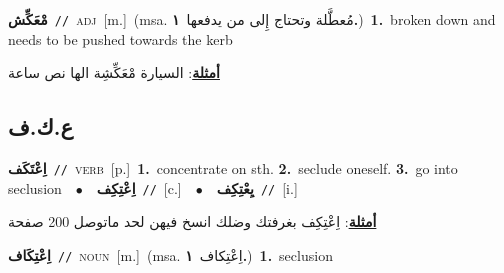 \documentclass[10pt,a4paper,twoside]{article} %
\begin{document}
\begin{multicols}{2}
{\setlength\topsep{0pt}\textbf{\foreignlanguage{arabic}{مْعَكِّش}}\ {\color{gray}\texttt{//}\color{black}}\ \textsc{adj}\ [m.]\ \color{gray}(msa. \foreignlanguage{arabic}{مُعطَّلة وتحتاج إِلى من يدفعها}~\foreignlanguage{arabic}{\textbf{١.}})\color{black}\ \textbf{1.}~broken down and needs to be pushed towards the kerb\  \begin{flushright}\color{gray}\foreignlanguage{arabic}{\textbf{\underline{\foreignlanguage{arabic}{أمثلة}}}: السيارة مْعَكِّشِة الها نص ساعة}\end{flushright}\color{black}} \vspace{2mm}

\vspace{-3mm}
\subsection*{\color{blue}\foreignlanguage{arabic}{ع.ك.ف}\color{blue}{}} 

{\setlength\topsep{0pt}\textbf{\foreignlanguage{arabic}{اِعْتَكَف}}\ {\color{gray}\texttt{//}\color{black}}\ \textsc{verb}\ [p.]\ \textbf{1.}~concentrate on sth.  \textbf{2.}~seclude oneself.  \textbf{3.}~go into seclusion\ \ $\bullet$\ \ \setlength\topsep{0pt}\textbf{\foreignlanguage{arabic}{اِعْتِكِف}}\ {\color{gray}\texttt{//}\color{black}}\ [c.]\ \ $\bullet$\ \ \setlength\topsep{0pt}\textbf{\foreignlanguage{arabic}{يِعْتِكِف}}\ {\color{gray}\texttt{//}\color{black}}\ [i.]\  \begin{flushright}\color{gray}\foreignlanguage{arabic}{\textbf{\underline{\foreignlanguage{arabic}{أمثلة}}}: اِعْتِكِف بغرفتك وضلك انسخ فيهن لحد ماتوصل 200 صفحة}\end{flushright}\color{black}} \vspace{2mm}

{\setlength\topsep{0pt}\textbf{\foreignlanguage{arabic}{اِعْتِكَاف}}\ {\color{gray}\texttt{//}\color{black}}\ \textsc{noun}\ [m.]\ \color{gray}(msa. \foreignlanguage{arabic}{اِعْتِكاف}~\foreignlanguage{arabic}{\textbf{١.}})\color{black}\ \textbf{1.}~seclusion\ } \vspace{2mm}


\end{multicols}
\end{document}
